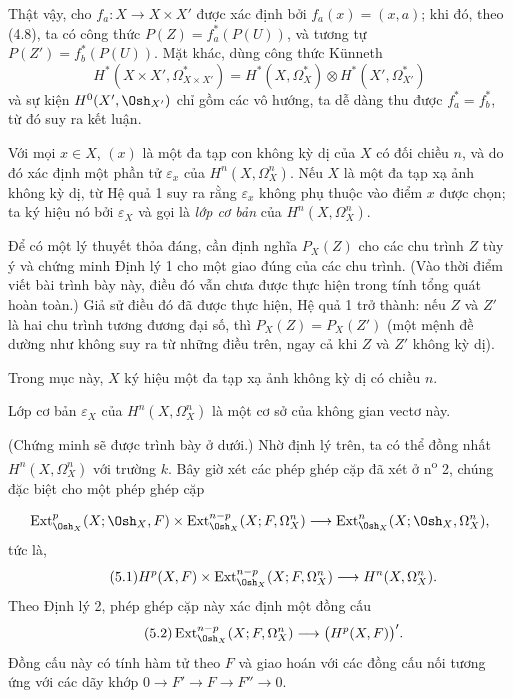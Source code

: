 Thật vậy, cho $f_a:X\longrightarrow X\times X'$ được xác định bởi
$f_a(x)=(x,a)$; khi đó, theo (4.8), ta có công thức
$P(Z)=f_a^{*}(P(U))$, và tương tự $P(Z')=f_b^{*}(P(U))$. Mặt khác, dùng công thức
Künneth
\[
  H^{*}(X\times X',\Omega_{X\times X'}^{*})
  =H^{*}(X,\Omega_X^{*})\otimes H^{*}(X',\Omega_{X'}^{*})
\]
và sự kiện $H^{0}(X',\Osh_{X'})$ chỉ gồm các vô hướng, ta dễ dàng thu được
$f_a^{*}=f_b^{*}$, từ đó suy ra kết luận.

Với mọi $x\in X$, $(x)$ là một đa tạp con không kỳ dị của $X$ có
đối chiều $n$, và do đó xác định một phần tử $\varepsilon_x$ của
$H^{n}(X,\Omega_X^{n})$. Nếu $X$ là một đa tạp xạ ảnh không kỳ dị, từ
Hệ quả 1 suy ra rằng $\varepsilon_x$ không phụ thuộc vào điểm $x$ được chọn; ta ký hiệu nó
bởi $\varepsilon_X$ và gọi là \emph{lớp cơ bản} của
$H^{n}(X,\Omega_X^{n})$.

 Để có một lý thuyết thỏa đáng, cần định nghĩa
$P_X(Z)$ cho các chu trình $Z$ tùy ý và chứng minh Định lý 1 cho một
giao đúng của các chu trình. (Vào thời điểm viết bài trình bày này, điều đó vẫn chưa được
thực hiện trong tính tổng quát hoàn toàn.) Giả sử điều đó đã được thực hiện, Hệ quả 1
trở thành: nếu $Z$ và $Z'$ là hai chu trình tương đương đại số, thì
$P_X(Z)=P_X(Z')$ (một mệnh đề dường như không suy ra từ những điều trên, ngay cả khi
$Z$ và $Z'$ không kỳ dị).


Trong mục này, $X$ ký hiệu một đa tạp xạ ảnh không kỳ dị có chiều
$n$.

 Lớp cơ bản $\varepsilon_X$ của
$H^{n}(X,\Omega_X^{n})$ là một cơ sở của không gian vectơ này.

(Chứng minh sẽ được trình bày ở dưới.) Nhờ định lý trên, ta có thể
đồng nhất $H^{n}(X,\Omega_X^{n})$ với trường $k$. Bây giờ xét các
phép ghép cặp đã xét ở n\textsuperscript{o} 2, chúng đặc biệt cho một
phép ghép cặp

\[
\operatorname{Ext}_{\Osh_X}^{p}(X;\Osh_X,F)
\times\operatorname{Ext}_{\Osh_X}^{n-p}(X;F,\Omega_X^{n})
\longrightarrow
\operatorname{Ext}_{\Osh_X}^{n}(X;\Osh_X,\Omega_X^{n}),
\]
tức là,
\begin{equation}\tag{5.1}
  H^{p}(X,F)
  \times\operatorname{Ext}_{\Osh_X}^{n-p}(X;F,\Omega_X^{n})
  \longrightarrow H^{n}(X,\Omega_X^{n}).
\end{equation}
Theo Định lý 2, phép ghép cặp này xác định một đồng cấu
\begin{equation}\tag{5.2}
  \operatorname{Ext}_{\Osh_X}^{n-p}(X;F,\Omega_X^{n})
  \longrightarrow\bigl(H^{p}(X,F)\bigr)'.
\end{equation}
Đồng cấu này có tính hàm tử theo $F$ và giao hoán với các đồng cấu nối
tương ứng với các dãy khớp $0\longrightarrow F'\longrightarrow F
\longrightarrow F''\longrightarrow0$.

